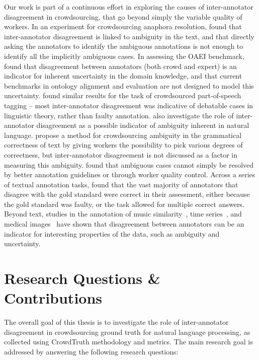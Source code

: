 Our work is part of a continuous effort in exploring the causes of inter-annotator disagreement in crowdsourcing, that go beyond simply the variable quality of workers. In an experiment for crowdsourcing anaphora resolution, \citet{poesio2005reliability} found that inter-annotator disagreement is linked to ambiguity in the text, and that directly asking the annotators to identify the ambiguous annotations is not enough to identify all the implicitly ambiguous cases. In assessing the OAEI benchmark, \citet{cheatham2014conference} found that disagreement between annotators (both crowd and expert) is an indicator for inherent uncertainty in the domain knowledge, and that current benchmarks in ontology alignment and evaluation are not designed to model this uncertainty. \citet{plank-hovy-sogaard:2014:P14-2} found similar results for the task of crowdsourced part-of-speech tagging -- most inter-annotator disagreement was indicative of debatable cases in linguistic theory, rather than faulty annotation. \citet{Bayerl2011} also investigate the role of inter-annotator disagreement as a possible indicator of ambiguity inherent in natural language. \citet{lau2014measuring} propose a method for crowdsourcing ambiguity in the grammatical correctness of text by giving workers the possibility to pick various degrees of correctness, but inter-annotator disagreement is not discussed as a factor in measuring this ambiguity. \citet{Chang:2017:Revolt} found that ambiguous cases cannot simply be resolved by better annotation guidelines or through worker quality control. Across a series of textual annotation tasks, \citet{chang2016linguistic} found that the vast majority of annotators that disagree with the gold standard were correct in their assessment, either because the gold standard was faulty, or the task allowed for multiple correct answers. Beyond text, studies in the annotation of music similarity~\cite{doi:10.1080/09298215.2016.1200631}, time series~\cite{schaekermann2016,schaekermann2018resolvable}, and medical images~\cite{cheplygina2018crowd} have shown that disagreement between annotators can be an indicator for interesting properties of the data, such as ambiguity and uncertainty.


\section{Research Questions \& Contributions}

The overall goal of this thesis is to investigate the role of inter-annotator disagreement in crowdsourcing ground truth for natural language processing, as collected using CrowdTruth methodology and metrics. The main research goal is addressed by answering the following research questions:

